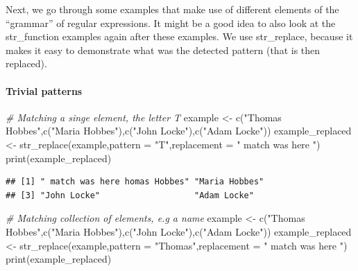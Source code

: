 \documentclass[
]{book}
\newenvironment{Shaded}{\begin{snugshade}}{\end{snugshade}}
\newcommand{\AttributeTok}[1]{\textcolor[rgb]{0.77,0.63,0.00}{#1}}
\newcommand{\CommentTok}[1]{\textcolor[rgb]{0.56,0.35,0.01}{\textit{#1}}}
\newcommand{\FunctionTok}[1]{\textcolor[rgb]{0.00,0.00,0.00}{#1}}
\newcommand{\NormalTok}[1]{#1}
\newcommand{\OtherTok}[1]{\textcolor[rgb]{0.56,0.35,0.01}{#1}}
\newcommand{\StringTok}[1]{\textcolor[rgb]{0.31,0.60,0.02}{#1}}
\begin{document}
Next, we go through some examples that make use of different elements of the ``grammar'' of regular expressions. It might be a good idea to also look at the str\_function examples again after these examples. We use str\_replace, because it makes it easy to demonstrate what was the detected pattern (that is then replaced).

\hypertarget{trivial-patterns}{%
\paragraph{Trivial patterns}\label{trivial-patterns}}

\begin{Shaded}
\begin{Highlighting}[]
\CommentTok{\# Matching a singe element, the letter T}
\NormalTok{example }\OtherTok{\textless{}{-}} \FunctionTok{c}\NormalTok{(}\StringTok{"Thomas Hobbes"}\NormalTok{,}\FunctionTok{c}\NormalTok{(}\StringTok{"Maria Hobbes"}\NormalTok{),}\FunctionTok{c}\NormalTok{(}\StringTok{"John Locke"}\NormalTok{),}\FunctionTok{c}\NormalTok{(}\StringTok{"Adam Locke"}\NormalTok{))}
\NormalTok{example\_replaced }\OtherTok{\textless{}{-}} \FunctionTok{str\_replace}\NormalTok{(example,}\AttributeTok{pattern =} \StringTok{"T"}\NormalTok{,}\AttributeTok{replacement =} \StringTok{" match was here "}\NormalTok{)}
\FunctionTok{print}\NormalTok{(example\_replaced)}
\end{Highlighting}
\end{Shaded}

\begin{verbatim}
## [1] " match was here homas Hobbes" "Maria Hobbes"                
## [3] "John Locke"                   "Adam Locke"
\end{verbatim}

\begin{Shaded}
\begin{Highlighting}[]
\CommentTok{\# Matching collection of elements, e.g a name}
\NormalTok{example }\OtherTok{\textless{}{-}} \FunctionTok{c}\NormalTok{(}\StringTok{"Thomas Hobbes"}\NormalTok{,}\FunctionTok{c}\NormalTok{(}\StringTok{"Maria Hobbes"}\NormalTok{),}\FunctionTok{c}\NormalTok{(}\StringTok{"John Locke"}\NormalTok{),}\FunctionTok{c}\NormalTok{(}\StringTok{"Adam Locke"}\NormalTok{))}
\NormalTok{example\_replaced }\OtherTok{\textless{}{-}} \FunctionTok{str\_replace}\NormalTok{(example,}\AttributeTok{pattern =} \StringTok{"Thomas"}\NormalTok{,}\AttributeTok{replacement =} \StringTok{" match was here "}\NormalTok{)}
\FunctionTok{print}\NormalTok{(example\_replaced)}
\end{Highlighting}
\end{Shaded}
\end{document}
